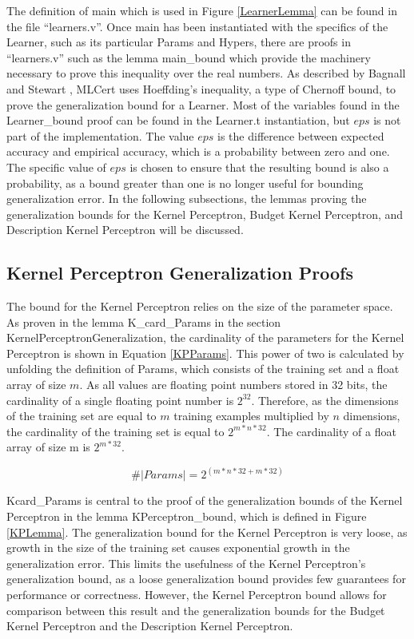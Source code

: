 The definition of main which is used in Figure \ref{LearnerLemma} can be found in the file ``learners.v''. Once main has been instantiated with the specifics of the Learner, such as its particular Params and Hypers, there are proofs in ``learners.v'' such as the lemma main\_bound which provide the machinery necessary to prove this inequality over the real numbers. As described by Bagnall and Stewart \cite{BS19}, MLCert uses Hoeffding's inequality, a type of Chernoff bound, to prove the generalization bound for a Learner. Most of the variables found in the Learner\_bound proof can be found in the Learner.t instantiation, but $eps$ is not part of the implementation. The value $eps$ is the difference between expected accuracy and empirical accuracy, which is a probability between zero and one. The specific value of $eps$ is chosen to ensure that the resulting bound is also a probability, as a bound greater than one is no longer useful for bounding generalization error. In the following subsections, the lemmas proving the generalization bounds for the Kernel Perceptron, Budget Kernel Perceptron, and Description Kernel Perceptron will be discussed.
\subsection{Kernel Perceptron Generalization Proofs}\label{KPProofs}
The bound for the Kernel Perceptron relies on the size of the parameter space. As proven in the lemma K\_card\_Params in the section KernelPerceptronGeneralization, the cardinality of the parameters for the Kernel Perceptron is shown in Equation \ref{KPParams}. This power of two is calculated by unfolding the definition of Params, which consists of the training set and a float array of size $m$. As all values are floating point numbers stored in 32 bits, the cardinality of a single floating point number is $2^{32}$. Therefore, as the dimensions of the training set are equal to $m$ training examples multiplied by $n$ dimensions, the cardinality of the training set is equal to $2^{m*n*32}$. The cardinality of a float array of size m is $2^{m * 32}$. 

\begin{equation} \label{KPParams}
 \#|Params| = 2^{(m*n*32 + m*32)}
\end{equation}

Kcard\_Params is central to the proof of the generalization bounds of the Kernel Perceptron in the lemma KPerceptron\_bound, which is defined in Figure \ref{KPLemma}. The generalization bound for the Kernel Perceptron is very loose, as growth in the size of the training set causes exponential growth in the generalization error. This limits the usefulness of the Kernel Perceptron's generalization bound, as a loose generalization bound provides few guarantees for performance or correctness. However, the Kernel Perceptron bound allows for comparison between this result and the generalization bounds for the Budget Kernel Perceptron and the Description Kernel Perceptron.

